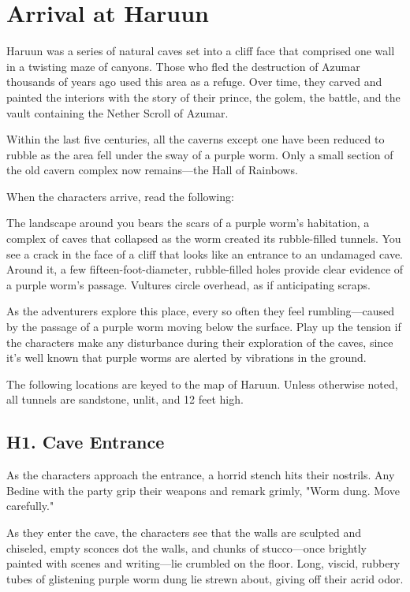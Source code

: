 \documentclass[10pt,a4paper,twoside,bg=print,twocolumn,openany,nodeprecatedcode]{dndbook}
\begin{document}
\section{Arrival at Haruun}
Haruun was a series of natural caves set into a cliff face that comprised one wall in a twisting maze of canyons. Those who fled the destruction of Azumar thousands of years ago used this area as a refuge. Over time, they carved and painted the interiors with the story of their prince, the golem, the battle, and the vault containing the Nether Scroll of Azumar.

Within the last five centuries, all the caverns except one have been reduced to rubble as the area fell under the sway of a purple worm. Only a small section of the old cavern complex now remains—the Hall of Rainbows.

When the characters arrive, read the following:

\begin{DndReadAloud}{}
The landscape around you bears the scars of a purple worm's habitation, a complex of caves that collapsed as the worm created its rubble-filled tunnels. You see a crack in the face of a cliff that looks like an entrance to an undamaged cave. Around it, a few fifteen-foot-diameter, rubble-filled holes provide clear evidence of a purple worm's passage. Vultures circle overhead, as if anticipating scraps.

\end{DndReadAloud}

As the adventurers explore this place, every so often they feel rumbling—caused by the passage of a purple worm moving below the surface. Play up the tension if the characters make any disturbance during their exploration of the caves, since it's well known that purple worms are alerted by vibrations in the ground.

The following locations are keyed to the map of Haruun. Unless otherwise noted, all tunnels are sandstone, unlit, and 12 feet high.

\subsection{H1. Cave Entrance}
As the characters approach the entrance, a horrid stench hits their nostrils. Any Bedine with the party grip their weapons and remark grimly, "Worm dung. Move carefully."

As they enter the cave, the characters see that the walls are sculpted and chiseled, empty sconces dot the walls, and chunks of stucco—once brightly painted with scenes and writing—lie crumbled on the floor. Long, viscid, rubbery tubes of glistening purple worm dung lie strewn about, giving off their acrid odor.
\end{document}
